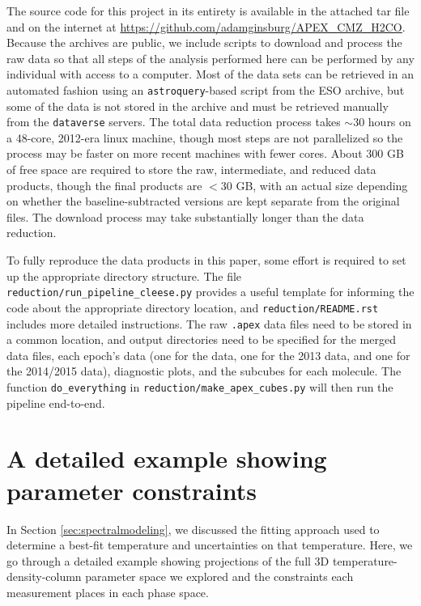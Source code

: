 The source code for this project in its entirety is available in the attached
tar file and on the internet at
\url{https://github.com/adamginsburg/APEX_CMZ_H2CO}.  Because the archives are
public, we include scripts to download and process the raw data so that all
steps of the analysis performed here can be performed by any individual with
access to a computer.  Most of the data sets can be retrieved in an automated
fashion using an \texttt{astroquery}-based script from the ESO archive, but
some of the data is not stored in the archive and must be retrieved manually
from the \texttt{dataverse} servers. The total data reduction process takes
$\sim30$ hours on a 48-core, 2012-era linux machine, though most steps are not
parallelized so the process may be faster on more recent machines with fewer
cores.  About 300 GB of free space are required to store the raw, intermediate,
and reduced data products, though the final products are $<30$ GB, with an
actual size depending on whether the baseline-subtracted versions are kept
separate from the original files.  The download process may take substantially
longer than the data reduction.

To fully reproduce the data products in this paper, some effort is required to
set up the appropriate directory structure.  The file
\texttt{reduction/run\_pipeline\_cleese.py} provides a useful template for
informing the code about the appropriate directory location, and
\texttt{reduction/README.rst} includes more detailed instructions.  The raw
\texttt{.apex} data files need to be stored in a common location, and output
directories need to be specified for the merged data files, each epoch's data
(one for the \citet{Ao2013a} data, one for the 2013 data, and one for the
2014/2015 data), diagnostic plots, and the subcubes for each molecule.  The
function \texttt{do\_everything} in \texttt{reduction/make\_apex\_cubes.py}
will then run the pipeline end-to-end.



\section{A detailed example showing parameter constraints}
In Section \ref{sec:spectralmodeling}, we discussed the fitting approach used
to determine a best-fit temperature and uncertainties on that temperature.
Here, we go through a detailed example showing projections of the full 3D
temperature-density-column parameter space we explored and the constraints
each measurement places in each phase space.

